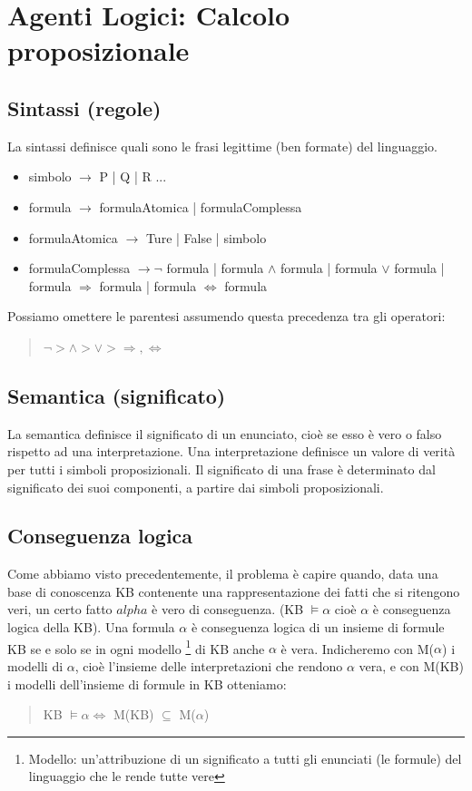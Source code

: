 \documentclass{article}
\begin{document}
\section{Agenti Logici: Calcolo proposizionale}

\subsection{Sintassi (regole)}
La sintassi definisce quali sono le frasi legittime (ben formate) del linguaggio.
\begin{itemize}
    \item simbolo $\to$ P | Q | R ...
    \item formula $\to$ formulaAtomica | formulaComplessa
    \item formulaAtomica $\to$ Ture | False | simbolo
    \item formulaComplessa $\to \neg$ formula | formula $\land$ formula | formula $\lor$ formula | formula $\Rightarrow$ formula | formula $\Leftrightarrow$ formula
\end{itemize}
Possiamo omettere le parentesi assumendo questa precedenza tra gli operatori:
\begin{quote}
    $\neg  >  \land  >  \lor  >  \Rightarrow, \Leftrightarrow$
\end{quote}

\subsection{Semantica (significato)}
La semantica definisce il significato di un enunciato, cioè se esso è vero o falso rispetto ad una interpretazione. Una interpretazione definisce un valore di verità per tutti i simboli proposizionali. Il significato di una frase è determinato dal significato dei suoi componenti, a partire dai simboli proposizionali.

\subsection{Conseguenza logica}
Come abbiamo visto precedentemente, il problema è capire quando, data una base di conoscenza KB contenente una rappresentazione dei fatti che si ritengono veri, un certo fatto $alpha$ è vero di conseguenza. (KB $\models \alpha$ cioè $\alpha$ è conseguenza logica della KB). \newline
Una formula $\alpha$ è conseguenza logica di un insieme di formule KB se e solo se in ogni modello \footnote{Modello: un'attribuzione di un significato a tutti gli enunciati (le formule) del linguaggio che le rende tutte vere} di KB anche $\alpha$ è vera. \clearpage
Indicheremo con M($\alpha$) i modelli di $\alpha$, cioè l’insieme delle interpretazioni che rendono $\alpha$ vera, e con M(KB) i modelli dell'insieme di formule in KB otteniamo:
\begin{quote}
    KB $\models \alpha \Leftrightarrow$ M(KB) $\subseteq$ M($\alpha$)
\end{quote}
\end{document}
